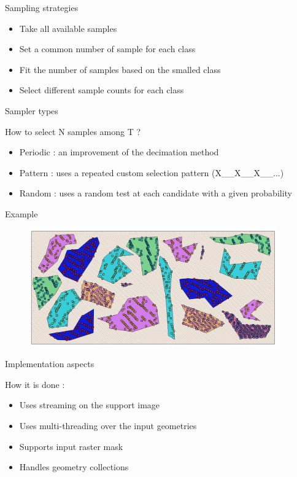 \documentclass[smaller]{beamer}
\begin{document}
\begin{frame}{Sampling strategies}

\begin{itemize}
   \item Take all available samples
   \item Set a common number of sample for each class
   \item Fit the number of samples based on the smalled class
   \item Select different sample counts for each class
\end{itemize}

\end{frame}

\begin{frame}{Sampler types}

How to select N samples among T ?
\begin{itemize}
   \item Periodic : an improvement of the decimation method
   \item Pattern : uses a repeated custom selection pattern (X\_\_X\_\_X\_\_...)
   \item Random : uses a random test at each candidate with a given probability
\end{itemize}

\end{frame}

\begin{frame}{Example}

\begin{figure}[ht]
\begin{center}
\includegraphics[height=2in]{images/sampling_position1.png}
\end{center}
\end{figure}

\end{frame}

\begin{frame}{Implementation aspects}

How it is done :
\begin{itemize}
   \item<2-> Uses streaming on the support image
   \item<3-> Uses multi-threading over the input geometries
   \item<4-> Supports input raster mask
   \item<5-> Handles geometry collections
\end{itemize}

\end{frame}
\end{document}
